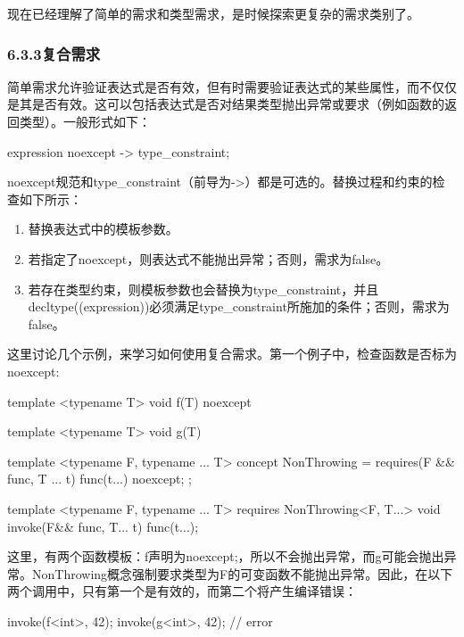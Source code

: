 现在已经理解了简单的需求和类型需求，是时候探索更复杂的需求类别了。

\subsubsection{6.3.3\hspace{0.2cm}复合需求}

简单需求允许验证表达式是否有效，但有时需要验证表达式的某些属性，而不仅仅是其是否有效。这可以包括表达式是否对结果类型抛出异常或要求（例如函数的返回类型）。一般形式如下：

\begin{cpp}
{ expression } noexcept -> type_constraint;
\end{cpp}

noexcept规范和type\_constraint（前导为->）都是可选的。替换过程和约束的检查如下所示：

\begin{enumerate}
\item
替换表达式中的模板参数。

\item
若指定了noexcept，则表达式不能抛出异常；否则，需求为false。

\item
若存在类型约束，则模板参数也会替换为type\_constraint，并且decltype((expression))必须满足type\_constraint所施加的条件；否则，需求为false。
\end{enumerate}

这里讨论几个示例，来学习如何使用复合需求。第一个例子中，检查函数是否标为noexcept:

\begin{cpp}
template <typename T>
void f(T) noexcept {}

template <typename T>
void g(T) {}

template <typename F, typename ... T>
concept NonThrowing = requires(F && func, T ... t)
{
	{func(t...)} noexcept;
};

template <typename F, typename ... T>
	requires NonThrowing<F, T...>
void invoke(F&& func, T... t)
{
	func(t...);
}
\end{cpp}

这里，有两个函数模板：f声明为noexcept;，所以不会抛出异常，而g可能会抛出异常。NonThrowing概念强制要求类型为F的可变函数不能抛出异常。因此，在以下两个调用中，只有第一个是有效的，而第二个将产生编译错误：

\begin{cpp}
invoke(f<int>, 42);
invoke(g<int>, 42); // error
\end{cpp}

